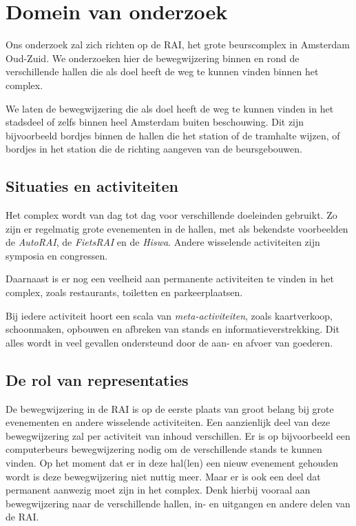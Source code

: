 \chapter{Domein van onderzoek}

Ons onderzoek zal zich richten op de RAI, het grote beurscomplex in Amsterdam Oud-Zuid. We onderzoeken hier de bewegwijzering binnen en rond de verschillende hallen die als doel heeft de weg te kunnen vinden binnen het complex.

We laten de bewegwijzering die als doel heeft de weg te kunnen vinden in het stadsdeel of zelfs binnen heel Amsterdam buiten beschouwing. Dit zijn bijvoorbeeld bordjes binnen de hallen die het station of de tramhalte wijzen, of bordjes in het station die de richting aangeven van de beursgebouwen.


\section{Situaties en activiteiten}

Het complex wordt van dag tot dag voor verschillende doeleinden gebruikt. Zo zijn er regelmatig grote evenementen in de hallen, met als bekendste voorbeelden de \emph{AutoRAI}, de \emph{FietsRAI} en de \emph{Hiswa}. Andere wisselende activiteiten zijn symposia en congressen.

Daarnaast is er nog een veelheid aan permanente activiteiten te vinden in het complex, zoals restaurants, toiletten en parkeerplaatsen.

Bij iedere activiteit hoort een scala van \emph{meta-activiteiten}, zoals kaartverkoop, schoonmaken, opbouwen en afbreken van stands en informatieverstrekking. Dit alles wordt in veel gevallen ondersteund door de aan- en afvoer van goederen.


\section{De rol van representaties}

De bewegwijzering in de RAI is op de eerste plaats van groot belang bij grote evenementen en andere wisselende activiteiten. Een aanzienlijk deel van deze bewegwijzering zal per activiteit van inhoud verschillen. Er is op bijvoorbeeld een computerbeurs bewegwijzering nodig om de verschillende stands te kunnen vinden. Op het moment dat er in deze hal(len) een nieuw evenement gehouden wordt is deze bewegwijzering niet nuttig meer.
Maar er is ook een deel dat permanent aanwezig moet zijn in het complex. Denk hierbij vooraal aan bewegwijzering naar de verschillende hallen, in- en uitgangen en andere delen van de RAI.

